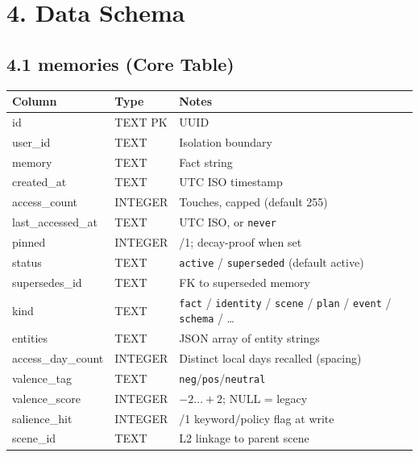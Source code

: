\documentclass[]{article}
\begin{document}
\hypertarget{data-schema}{%
\section{\texorpdfstring{\textbf{4. Data
Schema}}{4. Data Schema}}\label{data-schema}}

\hypertarget{memories-core-table}{%
\subsection{\texorpdfstring{\textbf{4.1 memories (Core
Table)}}{4.1 memories (Core Table)}}\label{memories-core-table}}

\begin{longtable}[]{@{}
  >{\raggedright\arraybackslash}p{}
  >{\raggedright\arraybackslash}p{}
  >{\raggedright\arraybackslash}p{}@{}}
\toprule\noalign{}
\textbf{Column} & \textbf{Type} & \textbf{Notes} \\
\midrule\noalign{}
\endhead
\bottomrule\noalign{}
\endlastfoot
id & TEXT PK & UUID \\
user\_id & TEXT & Isolation boundary \\
memory & TEXT & Fact string \\
created\_at & TEXT & UTC ISO timestamp \\
access\_count & INTEGER & Touches, capped (default 255) \\
last\_accessed\_at & TEXT & UTC ISO, or \texttt{never} \\
pinned & INTEGER & 0/1; decay-proof when set \\
status & TEXT & \texttt{active} / \texttt{superseded} (default active) \\
supersedes\_id & TEXT & FK to superseded memory \\
kind & TEXT & \texttt{fact} / \texttt{identity} / \texttt{scene} /
\texttt{plan} / \texttt{event} / \texttt{schema} / \ldots \\
entities & TEXT & JSON array of entity strings \\
access\_day\_count & INTEGER & Distinct local days recalled (spacing) \\
valence\_tag & TEXT & \texttt{neg}/\texttt{pos}/\texttt{neutral} \\
valence\_score & INTEGER & \(-2\ldots+2\); NULL = legacy \\
salience\_hit & INTEGER & 0/1 keyword/policy flag at write \\
scene\_id & TEXT & L2 linkage to parent scene \\
\end{longtable}
\end{document}
